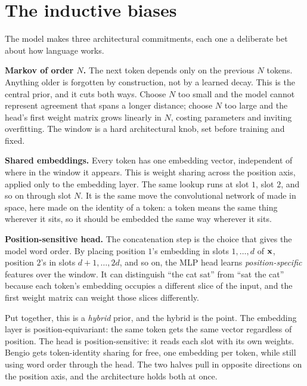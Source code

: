 
\section{The inductive biases}\label{sec:bengio-bias}

The model makes three architectural commitments, each one a deliberate
bet about how language works.

\textbf{Markov of order $N$.} The next token depends only on the previous
$N$ tokens. Anything older is forgotten by construction, not by a learned
decay. This is the central prior, and it cuts both ways. Choose $N$ too
small and the model cannot represent agreement that spans a longer
distance; choose $N$ too large and the head's first weight matrix grows
linearly in $N$, costing parameters and inviting overfitting. The window
is a hard architectural knob, set before training and fixed.

\textbf{Shared embeddings.} Every token has one embedding vector,
independent of where in the window it appears. This is weight sharing
across the position axis, applied only to the embedding layer. The same
lookup runs at slot $1$, slot $2$, and so on through slot $N$. It is the
same move the convolutional network of  made in space, here
made on the identity of a token: a token means the same thing wherever it
sits, so it should be embedded the same way wherever it sits.

\textbf{Position-sensitive head.} The concatenation step is the choice
that gives the model word order. By placing position $1$'s embedding in
slots $1, \ldots, d$ of $\mathbf{x}$, position $2$'s in slots $d+1, \ldots, 2d$,
and so on, the MLP head learns \emph{position-specific} features over the
window. It can distinguish ``the cat sat'' from ``sat the cat'' because
each token's embedding occupies a different slice of the input, and the
first weight matrix can weight those slices differently.

Put together, this is a \emph{hybrid} prior, and the hybrid is the point.
The embedding layer is position-equivariant: the same token gets the same
vector regardless of position. The head is position-sensitive: it reads
each slot with its own weights. Bengio gets token-identity sharing for
free, one embedding per token, while still using word order through the
head. The two halves pull in opposite directions on the position axis, and
the architecture holds both at once.

